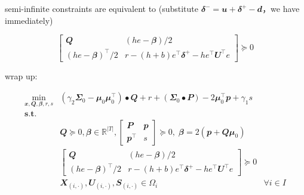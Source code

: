 \documentclass[
  a4paper,
,tablecaptionabove
]{scrartcl}
\numberwithin{equation}{section}
\begin{document}
semi-infinite constraints are equivalent to (substitute
\(\mathbfit\delta^- = \mathbfit u + \mathbfit \delta^+ - \mathbfit d\)，we
have immediately)

\[\begin{bmatrix}
    \mathbfit Q                  & (he- \mathbfit \beta)/2                                            \\
    (he- \mathbfit \beta)^\top/2 & r - (h+b)e^\top \mathbfit \delta^+ - h e^\top   \mathbfit U^\top e
  \end{bmatrix} \succeq 0\]

wrap up:

\[\begin{aligned}
    \min_{\mathbfit{x}, \mathbfit{Q}, \mathbfit{\beta}, r, s} & \left(\gamma_{2} \mathbfit{\Sigma}_{0}-\mathbfit{\mu}_{0} \mathbfit{\mu}_{0}^{\top}\right) \bullet \mathbfit{Q}+r+\left(\mathbfit{\Sigma}_{0} \bullet \mathbfit{P}\right)-2 \mathbfit{\mu}_{0}^{\top} \mathbfit{p} + \gamma_{1} s                  \\
    \mathbf { s.t. }                                          &                                                                                                                                                                                                                                                    \\
                                                              & \mathbfit{Q} \succeq 0, \mathbfit{\beta} \in \mathbb{R}^{|T|},
    \begin{bmatrix}
      \mathbfit{P}      & \mathbfit{p} \\
      \mathbfit{p}^\top & s
    \end{bmatrix} \succeq 0, \;
    \mathbfit \beta = 2 (\mathbfit p + \mathbfit{Q\mu}_0)                                                                                                                                                                                                                                                          \\
                                                              & \begin{bmatrix}
      \mathbfit Q                  & (he- \mathbfit \beta)/2                                            \\
      (he- \mathbfit \beta)^\top/2 & r - (h+b)e^\top \mathbfit \delta^+ - h e^\top   \mathbfit U^\top e
    \end{bmatrix} \succeq 0                                                                                                                                                                                                                \\
                                                              & \mathbfit X_{(i,\cdot)}, \mathbfit U_{(i,\cdot)}, \mathbfit S_{(i,\cdot)} \in \Omega_i                                                                                                                                            & \forall i\in I
  \end{aligned}\]
\end{document}

